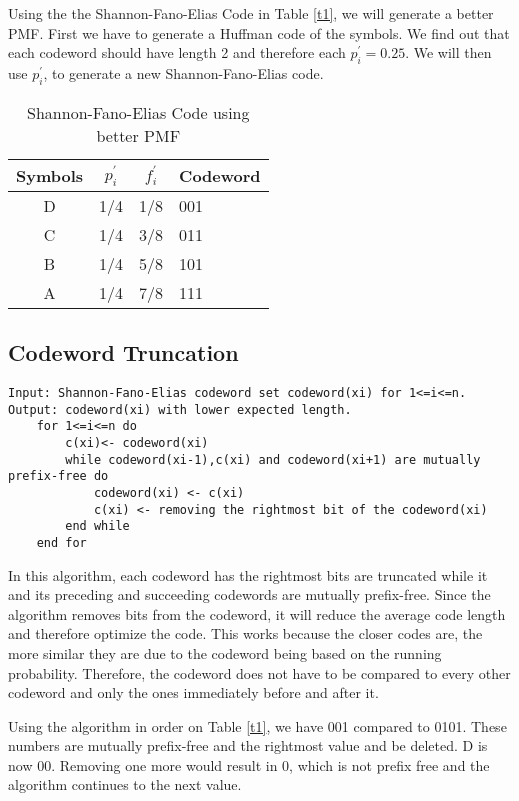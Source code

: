 \documentclass[10pt,letterpaper,notitlepage,draft]{article}
\theoremstyle{definition}
\begin{document}
Using the the Shannon-Fano-Elias Code in Table \ref{t1}, we will generate a better PMF. First we have to generate a Huffman code of the symbols. We find out that each codeword should have length 2 and therefore each $p_i^\prime = 0.25$. We will then use $p_i^\prime$, to generate a new Shannon-Fano-Elias code. 

\begin{table}[h]
\begin{center}
\begin{tabular}{|c|c|c|l|}
\hline
Symbols & $p_i^\prime$ & $f_i^\prime$ & Codeword \\ 
\hline 
\hline
D & 1/4 & 1/8 & 001 \\
\hline
C & 1/4 & 3/8 & 011 \\
\hline
B & 1/4 & 5/8 & 101 \\
\hline
A & 1/4 & 7/8 & 111 \\
\hline
\end{tabular}
\end{center}
\caption{Shannon-Fano-Elias Code using better PMF}\label{t2}
\end{table}


\subsection{Codeword Truncation}

\begin{lstlisting}[breaklines]
Input: Shannon-Fano-Elias codeword set codeword(xi) for 1<=i<=n.
Output: codeword(xi) with lower expected length.
    for 1<=i<=n do
        c(xi)<- codeword(xi)
        while codeword(xi-1),c(xi) and codeword(xi+1) are mutually prefix-free do
            codeword(xi) <- c(xi)
            c(xi) <- removing the rightmost bit of the codeword(xi)
        end while
    end for
\end{lstlisting}

In this algorithm, each codeword has the rightmost bits are truncated while it and its preceding and succeeding codewords are mutually prefix-free. Since the algorithm removes bits from the codeword, it will reduce the average code length and therefore optimize the code. This works because the closer codes are, the more similar they are due to the codeword being based on the running probability. Therefore, the codeword does not have to be compared to every other codeword and only the ones immediately before and after it. 

Using the algorithm in order on Table \ref{t1}, we have 
001 compared to 0101.  
These numbers are mutually prefix-free and the rightmost value and be deleted.  
D is now 00.  
Removing one more would result in 0, which is not prefix free and the algorithm continues to the next value.
\end{document}
